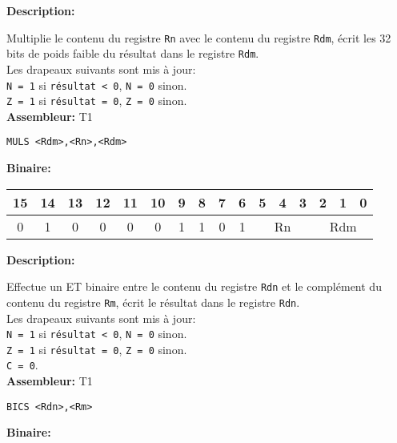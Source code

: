 \documentclass{article}
\begin{document}
    \textbf{Description: }

    Multiplie le contenu du registre \texttt{Rn} avec le contenu du registre \texttt{Rdm}, écrit les 32 bits de poids faible du résultat dans le registre \texttt{Rdm}.\\
    Les drapeaux suivants sont mis à jour:\\
    \texttt{N = 1} si \texttt{résultat < 0}, \texttt{N = 0} sinon.\\
    \texttt{Z = 1} si \texttt{résultat = 0}, \texttt{Z = 0} sinon.\\

    \textbf{Assembleur:} T1

    \begin{lstlisting}
MULS <Rdm>,<Rn>,<Rdm>
    \end{lstlisting}

    \textbf{Binaire:}

    \begin{tabular}{| c c c c c c c c c c c c c c c c |}
        \hline
        15 & 14 & 13 & 12 & 11 & 10 & \multicolumn{1}{|c}{9} & 8 & 7 & 6 & \multicolumn{1}{|c}{5} & 4 & 3 & \multicolumn{1}{|c}{2} & 1 & 0 \\
        \hline
        0 & 1 & 0 & 0 & 0 & 0 & \multicolumn{1}{|c}{1} & 1 & 0 & 1 & \multicolumn{3}{|c}{Rn} & \multicolumn{3}{|c|}{Rdm} \\
        \hline
    \end{tabular}



    \textbf{Description: }

    Effectue un ET binaire entre le contenu du registre \texttt{Rdn} et le complément du contenu du registre \texttt{Rm}, écrit le résultat dans le registre \texttt{Rdn}.\\
    Les drapeaux suivants sont mis à jour:\\
    \texttt{N = 1} si \texttt{résultat < 0}, \texttt{N = 0} sinon.\\
    \texttt{Z = 1} si \texttt{résultat = 0}, \texttt{Z = 0} sinon.\\
    \texttt{C = 0}.\\

    \textbf{Assembleur:} T1

    \begin{lstlisting}
BICS <Rdn>,<Rm>
    \end{lstlisting}

    \textbf{Binaire:}
\end{document}
